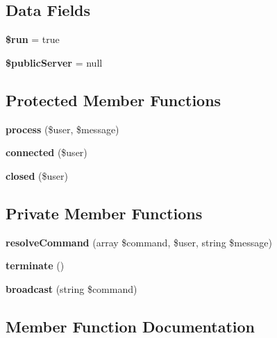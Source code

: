\subsection*{Data Fields}
\begin{DoxyCompactItemize}
\item 
\mbox{\label{class_lora_1_1_control_server_a1d6ddc9c52e0994f2ec85eb34cc1b1cf}} 
{\bfseries \$run} = true
\item 
\mbox{\label{class_lora_1_1_control_server_a2543b9ff8834fe7f10c97240667dd121}} 
{\bfseries \$public\+Server} = null
\end{DoxyCompactItemize}
\subsection*{Protected Member Functions}
\begin{DoxyCompactItemize}
\item 
\mbox{\label{class_lora_1_1_control_server_a805b6933fa0b69978e35fe94f3884de7}} 
{\bfseries process} (\$user, \$message)
\item 
\mbox{\label{class_lora_1_1_control_server_a3e89014762456a67edbe843811c78736}} 
{\bfseries connected} (\$user)
\item 
\mbox{\label{class_lora_1_1_control_server_aaf6375ec8ee41584a5adcf3d85d73018}} 
{\bfseries closed} (\$user)
\end{DoxyCompactItemize}
\subsection*{Private Member Functions}
\begin{DoxyCompactItemize}
\item 
\mbox{\label{class_lora_1_1_control_server_a6523ac8f5d1a8bc4978d80b60193ce73}} 
{\bfseries resolve\+Command} (array \$command, \$user, string \$message)
\item 
\textbf{ terminate} ()
\item 
\textbf{ broadcast} (string \$command)
\end{DoxyCompactItemize}


\subsection{Member Function Documentation}
\mbox{\label{class_lora_1_1_control_server_ab671527a81a457e51152cc532c716faa}} 
